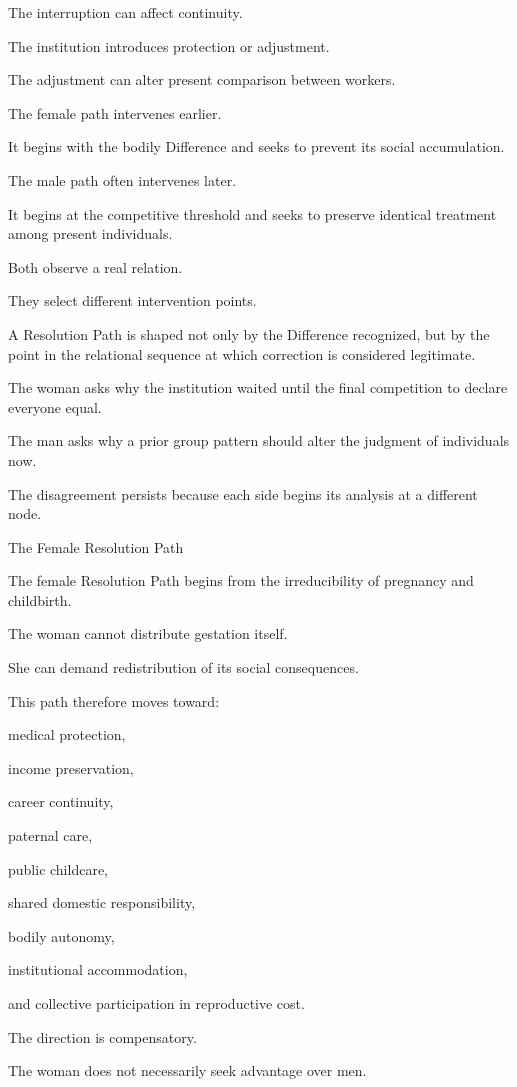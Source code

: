 The interruption can affect continuity.

The institution introduces protection or adjustment.

The adjustment can alter present comparison between workers.

The female path intervenes earlier.

It begins with the bodily Difference and seeks to prevent its social accumulation.

The male path often intervenes later.

It begins at the competitive threshold and seeks to preserve identical treatment among present individuals.

Both observe a real relation.

They select different intervention points.

A Resolution Path is shaped not only by the Difference recognized, but by the point in the relational sequence at which correction is considered legitimate.

The woman asks why the institution waited until the final competition to declare everyone equal.

The man asks why a prior group pattern should alter the judgment of individuals now.

The disagreement persists because each side begins its analysis at a different node.

The Female Resolution Path

The female Resolution Path begins from the irreducibility of pregnancy and childbirth.

The woman cannot distribute gestation itself.

She can demand redistribution of its social consequences.

This path therefore moves toward:

medical protection,

income preservation,

career continuity,

paternal care,

public childcare,

shared domestic responsibility,

bodily autonomy,

institutional accommodation,

and collective participation in reproductive cost.

The direction is compensatory.

The woman does not necessarily seek advantage over men.

